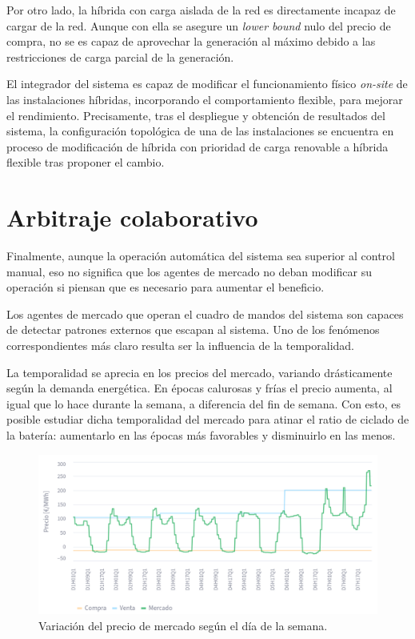 Por otro lado, la híbrida con carga aislada de la red es directamente incapaz de cargar de la red. Aunque con ella se asegure un \textit{lower bound} nulo del precio de compra, no se es capaz de aprovechar la generación al máximo debido a las restricciones de carga parcial de la generación.

El integrador del sistema es capaz de modificar el funcionamiento físico \textit{on-site} de las instalaciones híbridas, incorporando el comportamiento flexible, para mejorar el rendimiento. Precisamente, tras el despliegue y obtención de resultados del sistema, la configuración topológica de una de las instalaciones se encuentra en proceso de modificación de híbrida con prioridad de carga renovable a híbrida flexible tras proponer el cambio.

\section{Arbitraje colaborativo}
\label{makereference7.5}

Finalmente, aunque la operación automática del sistema sea superior al control manual, eso no significa que los agentes de mercado no deban modificar su operación si piensan que es necesario para aumentar el beneficio.

Los agentes de mercado que operan el cuadro de mandos del sistema son capaces de detectar patrones externos que escapan al sistema. Uno de los fenómenos correspondientes más claro resulta ser la influencia de la temporalidad.

La temporalidad se aprecia en los precios del mercado, variando drásticamente según la demanda energética. En épocas calurosas y frías el precio aumenta, al igual que lo hace durante la semana, a diferencia del fin de semana. Con esto, es posible estudiar dicha temporalidad del mercado para atinar el ratio de ciclado de la batería: aumentarlo en las épocas más favorables y disminuirlo en las menos.

\begin{figure}
  \centering
  \includegraphics[width=0.5\linewidth]{figures/temporalidad-mercado.png}
  \caption[Variación del precio de mercado según el día de la semana.]{Variación del precio de mercado según el día de la semana.}
  \label{fig:temporalidad-mercado}
\end{figure}

